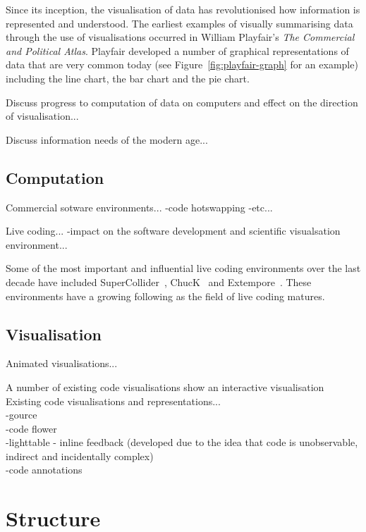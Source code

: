 Since its inception, the visualisation of data has revolutionised how information is represented and understood. The earliest examples of visually summarising data through the use of visualisations occurred in William Playfair's \textit{The Commercial and Political Atlas}. Playfair developed a number of graphical representations of data that are very common today (see Figure~\ref{fig:playfair-graph} for an example) including the line chart, the bar chart and the pie chart.

Discuss progress to computation of data on computers and effect on the direction of visualisation...

Discuss information needs of the modern age...

\subsection{Computation}

Commercial sotware environments...
-code hotswapping
-etc...

Live coding...
-impact on the software development and scientific visualsation environment...

Some of the most important and influential live coding environments over the last decade have included SuperCollider~\cite{McCartney}, ChucK~\cite{Wang2008} and Extempore~\cite{Sorensen}. These environments have a growing following as the field of live coding matures.

\subsection{Visualisation}

Animated visualisations...

A number of existing code visualisations show an interactive visualisation Existing code visualisations and representations...\\
-gource~\cite{Caudwell2010}\\
-code flower\\
-lighttable - inline feedback (developed due to the idea that code is unobservable, indirect and incidentally complex) \\
-code annotations~\cite{Swift2013}

\section{Structure}

